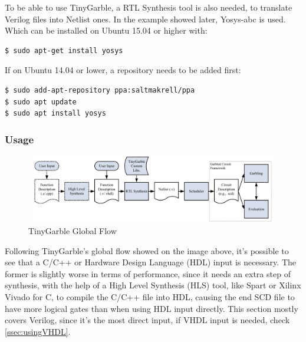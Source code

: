 \begin{refsection}
To be able to use TinyGarble, a RTL Synthesis tool is also needed, to translate Verilog files into Netlist ones. In the example showed later, Yosys-abc is used. Which can be installed on Ubuntu 15.04 or higher with:

\begin{lstlisting}[caption={Installation of Yosys-abc for Ubuntu 15.04>}, language=bash, captionpos=b]                                                                                                                                                                
$ sudo apt-get install yosys
\end{lstlisting}

If on Ubuntu 14.04 or lower, a repository needs to be added first:

\begin{lstlisting}[caption={Installation of Yosys-abc for Ubuntu 14.04<}, language=bash, captionpos=b] 
$ sudo add-apt-repository ppa:saltmakrell/ppa
$ sudo apt update                                                                                                                                                                                             
$ sudo apt install yosys
\end{lstlisting}

\newpage

\subsubsection{Usage}

\begin{figure}[H]
	\centering
	\includegraphics[width=1\textwidth, height=3cm]{./sdf/secure_multiparty_computation/figures/tiny_garble_flow.png}
    \caption{TinyGarble Global Flow\cite{Songhori}}\label{fig:tinygarble_flow}
\end{figure}

Following TinyGarble's global flow showed on the image above, it's possible to see that a C/C++ or Hardware Design Language (HDL) input is necessary. The former is slightly worse in terms of performance, since it needs an extra step of synthesis, with the help of a High Level Synthesis (HLS) tool, like Spart or Xilinx Vivado for C, to compile the C/C++ file into HDL, causing the end SCD file to have more logical gates than when using HDL input directly. This section mostly covers Verilog, since it's the most direct input, if VHDL input is needed, check \ref{ssec:usingVHDL}.


\end{refsection}
